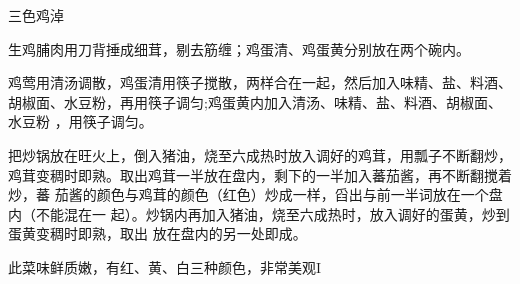 \begin{recipe}{三色鸡淖}

\ingredients


\preparation

\step 生鸡脯肉用刀背捶成细茸，剔去筋缠；鸡蛋清、鸡蛋黄分别放在两个碗内。

\step 鸡莺用清汤调散，鸡蛋清用筷子搅散，两样合在一起，然后加入味精、盐、料酒、
胡椒面、水豆粉，再用筷子调匀;鸡蛋黄内加入清汤、味精、盐、料酒、胡椒面、水豆粉
，用筷子调匀。

\step 把炒锅放在旺火上，倒入猪油，烧至六成热时放入调好的鸡茸，用瓢子不断翻炒，
鸡茸变稠时即熟。取出鸡茸一半放在盘内，剩下的一半加入蕃茄酱，再不断翻搅着炒，蕃
茄酱的颜色与鸡茸的颜色（红色）炒成一样，舀出与前一半词放在一个盘内（不能混在一
起）。炒锅内再加入猪油，烧至六成热时，放入调好的蛋黄，炒到蛋黄变稠时即熟，取出
放在盘内的另一处即成。

\features

此菜味鲜质嫩，有红、黄、白三种颜色，非常美观I

\end{recipe}

